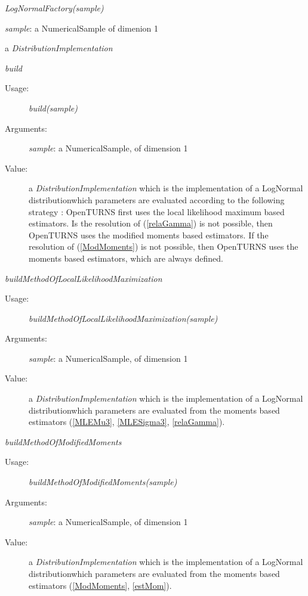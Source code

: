 \begin{description}
\item[Usage:] \textit{LogNormalFactory(sample)}

\item[Arguments:] \textit{sample}: a NumericalSample of dimenion 1

\item[Value:]  a \textit{DistributionImplementation}
\item[Some methods :]  \rule{0pt}{1em}

\begin{description}

\item \textit{build}
\begin{description}
\item[Usage:]  \textit{build(sample)}
\item[Arguments:] \textit{sample}: a  NumericalSample, of dimension 1
\item[Value:]  a \textit{DistributionImplementation} which is the implementation of a LogNormal distributionwhich parameters are evaluated according to the following strategy : OpenTURNS first uses the local likelihood maximum based estimators. Is the resolution of (\ref{relaGamma}) is not possible, then OpenTURNS uses the modified moments based estimators. If  the resolution of (\ref{ModMoments}) is not possible, then OpenTURNS uses the  moments based estimators, which are always defined.
\end{description}
\bigskip

\item \textit{buildMethodOfLocalLikelihoodMaximization}
\begin{description}
\item[Usage:]  \textit{buildMethodOfLocalLikelihoodMaximization(sample)}
\item[Arguments:] \textit{sample}: a  NumericalSample, of dimension 1
\item[Value:]  a \textit{DistributionImplementation} which is the implementation of a LogNormal distributionwhich parameters are evaluated from the moments based estimators (\ref{MLEMu3}, \ref{MLESigma3}, \ref{relaGamma}).
\end{description}
\bigskip

\item \textit{buildMethodOfModifiedMoments}
\begin{description}
\item[Usage:]  \textit{buildMethodOfModifiedMoments(sample)}
\item[Arguments:] \textit{sample}: a  NumericalSample, of dimension 1
\item[Value:]  a \textit{DistributionImplementation} which is the implementation of a LogNormal distributionwhich parameters are evaluated from the moments based estimators (\ref{ModMoments}, \ref{estMom}).
\end{description}
\bigskip


\end{description}
\end{description}
